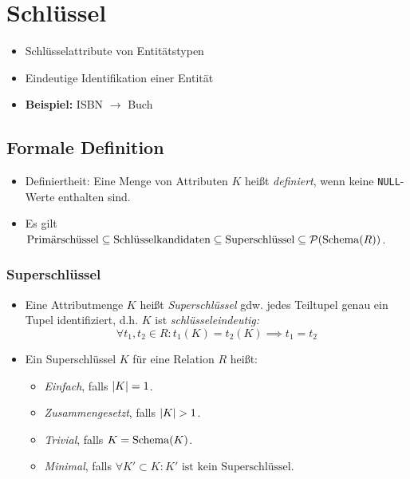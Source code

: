     \section{Schlüssel} %
        \begin{itemize}
        	\item Schlüsselattribute von Entitätstypen
        	\item Eindeutige Identifikation einer Entität
        	\item \textbf{Beispiel:} ISBN \(\rightarrow\) Buch
        \end{itemize}

        \subsection{Formale Definition} %
        	\begin{itemize}
        		\item Definiertheit: Eine Menge von Attributen \(K\) heißt \textit{definiert}, wenn keine \lstinline|NULL|-Werte enthalten sind.
        		\item Es gilt \( \text{Primärschüssel} \subseteq \text{Schlüsselkandidaten} \subseteq \text{Superschlüssel} \subseteq \mathcal{P}(\operatorname{Schema}(R)) \).
        	\end{itemize}

            \subsubsection{Superschlüssel} %
                \begin{itemize}
                	\item Eine Attributmenge \(K\) heißt \textit{Superschlüssel} gdw. jedes Teiltupel genau ein Tupel identifiziert, d.h. \(K\) ist \textit{schlüsseleindeutig:}
                		\begin{equation*}
                    		\forall t_1, t_2 \in R : t_1(K) = t_2(K) \implies t_1 = t_2
                		\end{equation*}
                	\item Ein Superschlüssel \(K\) für eine Relation \(R\) heißt:
                		\begin{itemize}
                			\item \textit{Einfach}, falls \( \abs{K} = 1 \).
                			\item \textit{Zusammengesetzt}, falls \( \abs{K} > 1 \).
                			\item \textit{Trivial}, falls \(K = \operatorname{Schema}(K)\).
                			\item \textit{Minimal}, falls \( \forall K' \subset K : K' \text{ ist kein Superschlüssel} \).
                		\end{itemize}
                \end{itemize}

